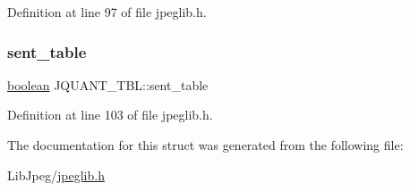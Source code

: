 Definition at line 97 of file jpeglib.\+h.

\mbox{\label{structJQUANT__TBL_a218b782157eccfbd22023ae6bb4cc7fa}} 
\subsubsection{\texorpdfstring{sent\_table}{sent\_table}}
{\footnotesize\ttfamily \mbox{\hyperlink{jmorecfg_8h_a7c6368b321bd9acd0149b030bb8275ed}{boolean}} J\+Q\+U\+A\+N\+T\+\_\+\+T\+B\+L\+::sent\+\_\+table}



Definition at line 103 of file jpeglib.\+h.



The documentation for this struct was generated from the following file\+:\begin{DoxyCompactItemize}
\item 
Lib\+Jpeg/\mbox{\hyperlink{jpeglib_8h}{jpeglib.\+h}}\end{DoxyCompactItemize}
